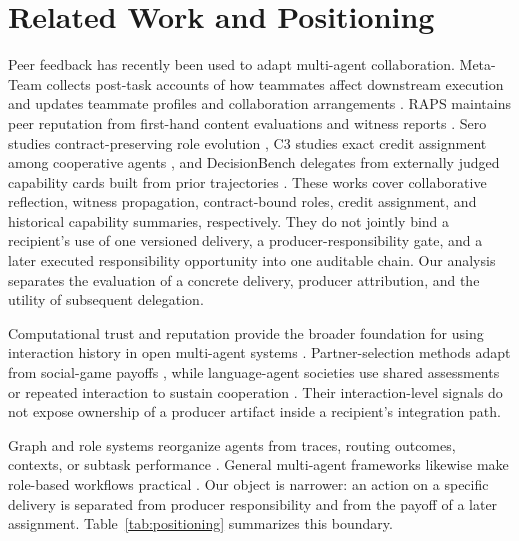 \documentclass[sigconf,anonymous]{aamas}
\begin{document}
\section{Related Work and Positioning}
Peer feedback has recently been used to adapt multi-agent collaboration. Meta-Team collects post-task accounts of how teammates affect downstream execution and updates teammate profiles and collaboration arrangements \cite{hao2026metateam}. RAPS maintains peer reputation from first-hand content evaluations and witness reports \cite{li2026raps}. Sero studies contract-preserving role evolution \cite{ge2026sero}, C3 studies exact credit assignment among cooperative agents \cite{chen2026c3}, and DecisionBench delegates from externally judged capability cards built from prior trajectories \cite{gao2026decisionbench}. These works cover collaborative reflection, witness propagation, contract-bound roles, credit assignment, and historical capability summaries, respectively. They do not jointly bind a recipient's use of one versioned delivery, a producer-responsibility gate, and a later executed responsibility opportunity into one auditable chain. Our analysis separates the evaluation of a concrete delivery, producer attribution, and the utility of subsequent delegation.

Computational trust and reputation provide the broader foundation for using interaction history in open multi-agent systems \cite{sabater2002reputation,pinyol2013trust}. Partner-selection methods adapt from social-game payoffs \cite{leung2024partner,leung2025partner,russell2026partner}, while language-agent societies use shared assessments or repeated interaction to sustain cooperation \cite{ren2026reputation,piatti2024cooperate,akata2025repeated}. Their interaction-level signals do not expose ownership of a producer artifact inside a recipient's integration path.

Graph and role systems reorganize agents from traces, routing outcomes, contexts, or subtask performance \cite{yang2025agentnet,zhuge2024gptswarm,zhang2026dynamic,li2026morse}. General multi-agent frameworks likewise make role-based workflows practical \cite{wu2023autogen,metagpt2024,agentverse2024}. Our object is narrower: an action on a specific delivery is separated from producer responsibility and from the payoff of a later assignment. Table~\ref{tab:positioning} summarizes this boundary.
\end{document}
